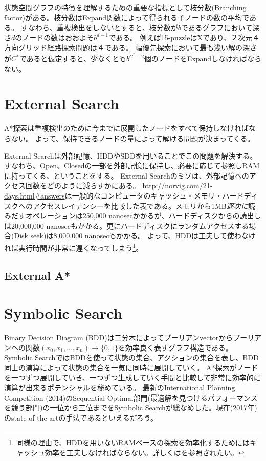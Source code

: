 \documentclass{report}
\begin{document}
状態空間グラフの特徴を理解するための重要な指標として枝分数(Branching factor)がある。枝分数はExpand関数によって得られる子ノードの数の平均である。
すなわち、重複検出をしないとすると、枝分数が$b$であるグラフにおいて深さ$d$のノードの数はおおよそ$b^{d-1}$である。
例えば15-puzzleはXであり、２次元４方向グリッド経路探索問題は４である。
幅優先探索において最も浅い解の深さが$C^*$であると仮定すると、少なくとも$b^{C^*-2}$個のノードをExpandしなければならない。



\section{External Search}

A*探索は重複検出のために今までに展開したノードをすべて保持しなければならない。
よって、保持できるノードの量によって解ける問題が決まってくる。

External Searchは外部記憶、HDDやSDDを用いることでこの問題を解決する。
すなわち、Open、Closedの一部を外部記憶に保持し、必要に応じて参照しRAMに持ってくる、ということをする。
External Searchのミソは、外部記憶へのアクセス回数をどのように減らすかにある。
\url{http://norvig.com/21-days.html#answers}は一般的なコンピュータのキャッシュ・メモリ・ハードディスクへのアクセスレイテンシーを比較した表である。メモリから1MB{\it 逐次に}読みだすオペレーションは250,000 nanosecかかるが、ハードディスクからの読出しは20,000,000 nanosecもかかる。更にハードディスクにランダムアクセスする場合(Disk seek)は8,000,000 nanosecもかかる。
よって、HDDは工夫して使わなければ実行時間が非常に遅くなってしまう\footnote{同様の理由で、HDDを用いないRAMベースの探索を効率化するためにはキャッシュ効率を工夫しなければならない。詳しくは\cite{burns2012implementing}を参照されたい。}。

\subsection{External A*}


\section{Symbolic Search}

Binary Decision Diagram (BDD)は二分木によってブーリアンvectorからブーリアンへの関数$(x_0,x_1,...,x_n) \rightarrow \{0, 1\}$を効率良く表すグラフ構造である。
Symbolic SearchではBDDを使って状態の集合、アクションの集合を表し、BDD同士の演算によって状態の集合を一気に同時に展開していく。
A*探索がノードを一つずつ展開していき、一つずつ生成していく手間と比較して非常に効率的に演算が出来るポテンシャルを秘めている。
最新のInternational Planning Competition (2014)のSequential Optimal部門(最適解を見つけるパフォーマンスを競う部門)の一位から三位までをSymbolic Searchが総なめした。現在(2017年)のstate-of-the-artの手法であるといえるだろう。
\end{document}
